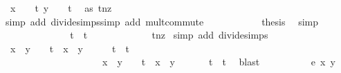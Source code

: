 \begin{isabellebody}
\ {\isachardoublequoteopen}x\ {\isacharequal}\ {}\ {\isacharslash}\ t{\isachardoublequoteclose}\ {\isachardoublequoteopen}y\ {\isacharequal}\ {}\ {\isacharslash}\ t{\isachardoublequoteclose}\ \isamarkupfalse%
\ as\ t{\isacharunderscore}nz\ \isanewline
\ \ \ \ \ \ \ \ \ \ \isamarkupfalse%
{\isacharparenleft}simp\ add{\isacharcolon}\ divide{\isacharunderscore}simps{\isacharcomma}simp\ add{\isacharcolon}\ mult{\isachardot}commute{\isacharparenright}{\isacharplus}\isanewline
\ \ \ \ \ \ \ \ \isamarkupfalse%
\ \isamarkupfalse%
\ {\isacharquery}thesis\ \isamarkupfalse%
\ simp\isanewline
\ \ \ \ \ \ \isamarkupfalse%
\isanewline
\ \ \ \ \ \ \isamarkupfalse%
\ \isamarkupfalse%
\ {\isachardoublequoteopen}{\isachardot}{\isachardot}{\isachardot}\ {\isacharequal}\ {}\ {\isacharasterisk}\ {\isacharparenleft}{}{\isacharminus}t{\isacharparenright}\ {\isacharslash}\ t{\isachardoublequoteclose}\ \ \ \isanewline
\ \ \ \ \ \ \ \ \isamarkupfalse%
\ t{\isacharunderscore}nz\ \isamarkupfalse%
{\isacharparenleft}simp\ add{\isacharcolon}\ divide{\isacharunderscore}simps{\isacharparenright}\isanewline
\ \ \ \ \ \ \isamarkupfalse%
\ \isamarkupfalse%
\ {\isachardoublequoteopen}x\ {\isacharplus}\ y\ {\isacharminus}\ {}\ {\isacharminus}\ t\ {\isacharasterisk}\ x\ {\isacharasterisk}\ y\ {\isacharequal}\ {}\ {\isacharasterisk}\ {\isacharparenleft}{}\ {\isacharminus}\ t{\isacharparenright}\ {\isacharslash}\ t\ {\isasymor}\isanewline
\ \ \ \ \ \ \ \ \ \ \ \ \ \ \ \ \ \ \ \ x\ {\isacharplus}\ y\ {\isacharminus}\ {}\ {\isacharminus}\ t\ {\isacharasterisk}\ x\ {\isacharasterisk}\ y\ {\isacharequal}\ {}\ {\isacharasterisk}\ {\isacharparenleft}{\isacharminus}\ {}\ {\isacharminus}\ t{\isacharparenright}\ {\isacharslash}\ t{\isachardoublequoteclose}\ \isamarkupfalse%
\ blast\isanewline
\ \ \ \ \isamarkupfalse%
\isanewline
\ \ \isamarkupfalse%
\ \isamarkupfalse%
\ {\isachardoublequoteopen}e{\isacharprime}\ x\ y\ {\isasymnoteq}\ {}{\isachardoublequoteclose}\ \isanewline

\end{isabellebody}
